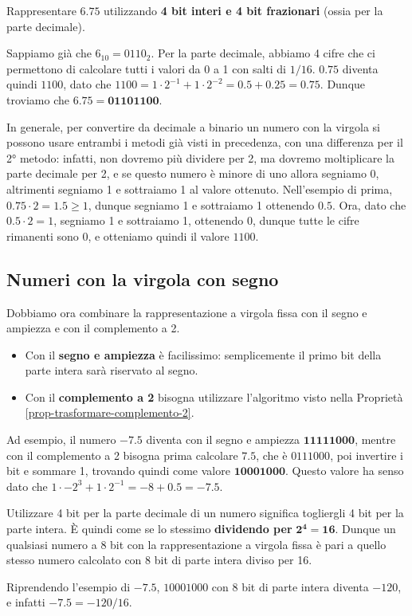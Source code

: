 \documentclass[11pt, a4paper, titlepage, oneside]{scrbook}
\begin{document}
\Esempio \nopagebreak

Rappresentare $\bm{6.75}$ utilizzando \textbf{4 bit interi e 4 bit frazionari} (ossia per la parte decimale). \nopagebreak

Sappiamo già che $6_{10} = 0110_2$. Per la parte decimale, abbiamo 4 cifre  che ci permettono di calcolare tutti i valori da 0 a 1 con salti di $1/16$. $0.75$ diventa quindi $1100$, dato che $1100 = 1 \cdot 2^{-1} + 1 \cdot 2^{-2} = 0.5 + 0.25 =  0.75$. Dunque troviamo che $\bm{6.75 = 01101100}$.

In generale, per convertire da decimale a binario un numero con la virgola si possono usare entrambi i metodi già visti in precedenza, con una differenza per il 2° metodo: infatti, non dovremo più dividere per 2, ma dovremo moltiplicare la parte decimale per 2, e se questo numero è minore di uno allora segniamo 0, altrimenti segniamo 1 e sottraiamo 1 al valore ottenuto. Nell'esempio di prima, $0.75 \cdot 2 = 1.5 \geq 1$, dunque segniamo 1 e sottraiamo 1 ottenendo $0.5$. Ora, dato che $0.5 \cdot 2 = 1$, segniamo 1 e sottraiamo 1, ottenendo 0, dunque tutte le cifre rimanenti sono 0, e otteniamo quindi il valore $1100$.

\subsection{Numeri con la virgola con segno}

Dobbiamo ora combinare la rappresentazione a virgola fissa con il segno e ampiezza e con il complemento a 2.

\begin{itemize}
    \item Con il \textbf{segno e ampiezza} è facilissimo: semplicemente il primo bit della parte intera sarà riservato al segno.
    \item Con il \textbf{complemento a 2} bisogna utilizzare l'algoritmo visto nella Proprietà \ref{prop-trasformare-complemento-2}. 
\end{itemize}

Ad esempio, il numero $-7.5$ diventa con il segno e ampiezza $\bm{11111000}$, mentre con il complemento a 2 bisogna prima calcolare $7.5$, che è $0111000$, poi invertire i bit e sommare 1, trovando quindi come valore $\bm{10001000}$. Questo valore ha senso dato che $1 \cdot -2^3 + 1 \cdot 2^{-1} = -8 + 0.5 = -7.5$.

\begin{Proposizione}[]
\label{propos-numeri-decimali}
Utilizzare 4 bit per la parte decimale di un numero significa togliergli 4 bit per la parte intera. È quindi come se lo stessimo \textbf{dividendo per} $\bm{2^4 = 16}$. Dunque un qualsiasi numero a 8 bit con la rappresentazione a virgola fissa è pari a quello stesso numero calcolato con 8 bit di parte intera diviso per 16.
\end{Proposizione}
Riprendendo l'esempio di $-7.5$, $10001000$ con 8 bit di parte intera diventa $-120$, e infatti $-7.5 = -120/16$.
\end{document}
